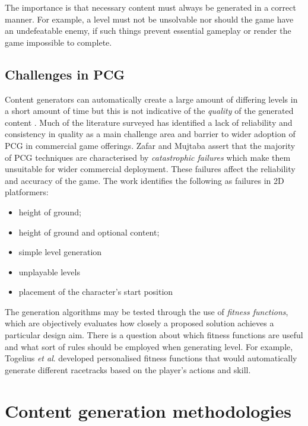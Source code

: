 \documentclass[11pt, a4paper, oneside]{report} %
\begin{document}
The importance is that necessary content must always be generated in a correct
manner. For example, a level must not be unsolvable nor should the game have an
undefeatable enemy, if such things prevent essential gameplay or render the game
impossible to complete.

\subsection{Challenges in PCG}

Content generators can automatically create a large amount of differing levels
in a short amount of time but this is not indicative of the \textit{quality} of
the generated content \cite{Smith:2009:RLG:1536513.1536548}. Much of the
literature surveyed has identified a lack of reliability and consistency in
quality as a main challenge area and barrier to wider adoption of PCG in
commercial game offerings. Zafar and Mujtaba \cite{6424299} assert that the
majority of PCG techniques are characterised by \textit{catastrophic failures}
which make them unsuitable for wider commercial deployment. These failures
affect the reliability and accuracy of the game. The work identifies the
following as failures in 2D platformers:

\begin{itemize}

  \item height of ground;
  \item height of ground and optional content;
  \item simple level generation
  \item unplayable levels
  \item placement of the character's start position

\end{itemize}

The generation algorithms may be tested through the use of \textit{fitness
functions}, which are objectively evaluates how closely a proposed solution
achieves a particular design aim. There is a question about which fitness
functions are useful and what sort of rules should be employed when generating
level. For example, Togelius \textit{et al}. \cite{togelius2007towards}
developed personalised fitness functions that would automatically generate
different racetracks based on the player's actions and skill.


\section{Content generation methodologies}
\end{document}
